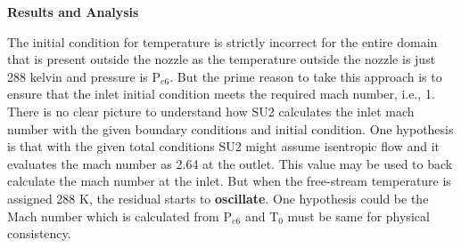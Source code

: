 \newpage
\begin{flushleft}
\textbf{Results and Analysis}\\
\end{flushleft}
The initial condition for temperature is strictly incorrect for the entire domain that is present outside the nozzle as the temperature outside the nozzle is just 288 kelvin and pressure is P$_{e6}$. But the prime reason to take this approach is to ensure that the inlet initial condition meets the required mach number, i.e., 1. There is no clear picture to understand how SU2 calculates the inlet mach number with the given boundary conditions and initial condition. One hypothesis is that with the given total conditions SU2 might assume isentropic flow and it evaluates the mach number as 2.64 at the outlet. This value may be used to back calculate the mach number at the inlet. But when the free-stream temperature is assigned 288 K, the residual starts to \textbf{oscillate}. One hypothesis could be the Mach number which is calculated from P$_{e6}$ and T$_0$ must be same for physical consistency.\\
\newpage